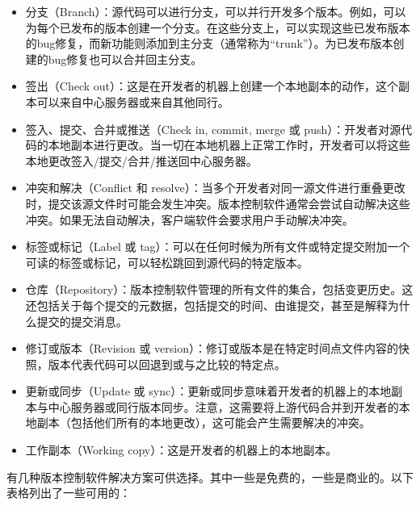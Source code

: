 \begin{itemize}
\item
分支（Branch）：源代码可以进行分支，可以并行开发多个版本。例如，可以为每个已发布的版本创建一个分支。在这些分支上，可以实现这些已发布版本的bug修复，而新功能则添加到主分支（通常称为“trunk”）。为已发布版本创建的bug修复也可以合并回主分支。

\item
签出（Check out）：这是在开发者的机器上创建一个本地副本的动作，这个副本可以来自中心服务器或来自其他同行。

\item
签入、提交、合并或推送（Check in, commit, merge 或 push）：开发者对源代码的本地副本进行更改。当一切在本地机器上正常工作时，开发者可以将这些本地更改签入/提交/合并/推送回中心服务器。

\item
冲突和解决（Conflict 和 resolve）：当多个开发者对同一源文件进行重叠更改时，提交该源文件时可能会发生冲突。版本控制软件通常会尝试自动解决这些冲突。如果无法自动解决，客户端软件会要求用户手动解决冲突。

\item
标签或标记（Label 或 tag）：可以在任何时候为所有文件或特定提交附加一个可读的标签或标记，可以轻松跳回到源代码的特定版本。

\item
仓库（Repository）：版本控制软件管理的所有文件的集合，包括变更历史。这还包括关于每个提交的元数据，包括提交的时间、由谁提交，甚至是解释为什么提交的提交消息。

\item
修订或版本（Revision 或 version）：修订或版本是在特定时间点文件内容的快照，版本代表代码可以回退到或与之比较的特定点。

\item
更新或同步（Update 或 sync）：更新或同步意味着开发者的机器上的本地副本与中心服务器或同行版本同步。注意，这需要将上游代码合并到开发者的本地副本（包括他们所有的本地更改），这可能会产生需要解决的冲突。

\item
工作副本（Working copy）：这是开发者的机器上的本地副本。
\end{itemize}

有几种版本控制软件解决方案可供选择。其中一些是免费的，一些是商业的。以下表格列出了一些可用的：

